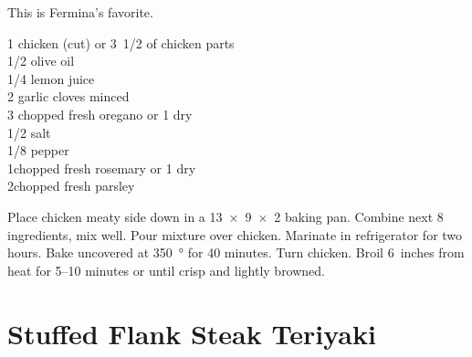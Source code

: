 \begin{open}
  This is Fermina's favorite.
\end{open}
\begin{ingredients}
  1 chicken (cut) or \SI{1/2}[3]{\pound} of chicken parts      \\
  \SI{1/2}{\cup} olive oil                                     \\
  \SI{1/4}{\cup} lemon juice                                   \\
  2 garlic cloves minced                                       \\
  \SI{3}{\tblspoon} chopped fresh oregano or \SI{1}{\tblspoon} dry \\
  \SI{1/2}{\teaspoon} salt                                     \\
  \SI{1/8}{\teaspoon} pepper                                   \\
  \SI{1}{\tblspoon}chopped fresh rosemary or \SI{1}{\teaspoon} dry \\
  \SI{2}{\tblspoon}chopped fresh parsley
\end{ingredients}
Place chicken meaty side down in a \SI{13x9x2}{\inch} baking pan.  Combine
next 8 ingredients, mix well.  Pour mixture over chicken.  Marinate in
refrigerator for two hours.  Bake uncovered at \SI{350}{\degree} for 40 minutes.
Turn chicken.  Broil 6~inches from heat for \numrange{5}{10} minutes or
until crisp and lightly browned.

\section{Stuffed Flank Steak Teriyaki
}

